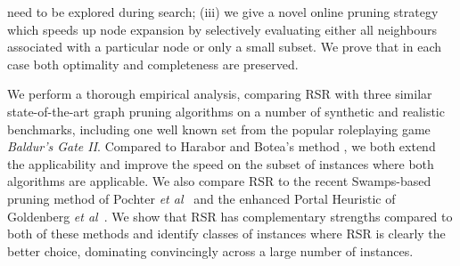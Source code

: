 need to be explored during search; (iii) we give a novel online pruning strategy
which speeds up node expansion by selectively evaluating either all neighbours
associated with a particular node or only a small subset.  We prove that in each
case both optimality and completeness are preserved.
\par
We perform a thorough empirical analysis, comparing RSR with three similar
state-of-the-art graph pruning algorithms on a
number of synthetic and realistic benchmarks, including one well known set from
the popular roleplaying game \emph{Baldur's Gate II}.  Compared to Harabor and
Botea's method \cite{harabor10}, we both extend the applicability and improve
the speed on the subset of instances where both algorithms are applicable.
We also compare RSR to the recent Swamps-based pruning method of Pochter \emph{et
al}~\cite{pochter10} and the enhanced Portal Heuristic of Goldenberg \emph{et
al}~\cite{goldenberg10}. 
We show that RSR has complementary strengths compared to both of these methods 
and identify classes of instances where RSR is clearly the better choice, 
dominating convincingly across a large number of instances.

